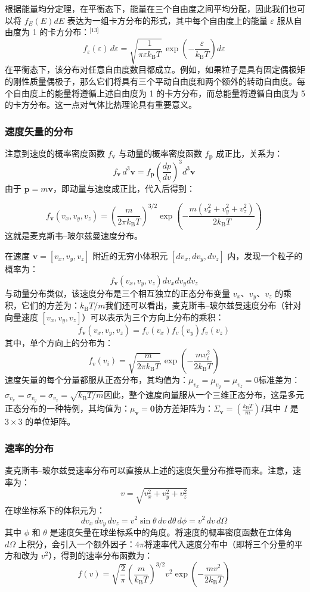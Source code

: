 根据能量均分定理，在平衡态下，能量在三个自由度之间平均分配，因此我们也可以将 $f_E(E) dE$ 表达为一组卡方分布的形式，其中每个自由度上的能量 $\varepsilon$ 服从自由度为 1 的卡方分布：\(^\text{[13]}\)
$$
f_\varepsilon(\varepsilon)\, d\varepsilon = \sqrt{ \frac{1}{\pi \varepsilon k_{\text{B}} T} }\, \exp\left( -\frac{\varepsilon}{k_{\text{B}} T} \right) d\varepsilon~
$$
在平衡态下，该分布对任意自由度数目都成立。例如，如果粒子是具有固定偶极矩的刚性质量偶极子，那么它们将具有三个平动自由度和两个额外的转动自由度。每个自由度上的能量将遵循上述自由度为 1 的卡方分布，而总能量将遵循自由度为 5 的卡方分布。这一点对气体比热理论具有重要意义。
\subsubsection{速度矢量的分布}
注意到速度的概率密度函数 $f_{\mathbf{v}}$ 与动量的概率密度函数 $f_{\mathbf{p}}$ 成正比，关系为：
$$
f_{\mathbf{v}}\, d^3\mathbf{v} = f_{\mathbf{p}} \left( \frac{dp}{dv} \right)^3 d^3\mathbf{v}~
$$
由于 $\mathbf{p} = m \mathbf{v}$，即动量与速度成正比，代入后得到：

$$
f_{\mathbf{v}}(v_x, v_y, v_z) = \left( \frac{m}{2\pi k_{\text{B}} T} \right)^{3/2} \exp\left( -\frac{m (v_x^2 + v_y^2 + v_z^2)}{2 k_{\text{B}} T} \right)~
$$
这就是麦克斯韦–玻尔兹曼速度分布。

在速度 $\mathbf{v} = [v_x, v_y, v_z]$ 附近的无穷小体积元 $[dv_x, dv_y, dv_z]$ 内，发现一个粒子的概率为：
$$
f_{\mathbf{v}}(v_x, v_y, v_z) dv_x dv_y dv_z~
$$
与动量分布类似，该速度分布是三个相互独立的正态分布变量 $v_x$、$v_y$、$v_z$ 的乘积，它们的方差为：$k_{\text{B}} T/m$我们还可以看出，麦克斯韦–玻尔兹曼速度分布（针对向量速度 $[v_x, v_y, v_z]$）可以表示为三个方向上分布的乘积：
$$
f_{\mathbf{v}}(v_x, v_y, v_z) = f_v(v_x) f_v(v_y) f_v(v_z)~
$$
其中，单个方向上的分布为：
$$
f_v(v_i) = \sqrt{ \frac{m}{2\pi k_{\text{B}} T} }\, \exp\left( -\frac{m v_i^2}{2 k_{\text{B}} T} \right)~
$$
速度矢量的每个分量都服从正态分布，其均值为：$\mu_{v_x} = \mu_{v_y} = \mu_{v_z} = 0$标准差为：$\sigma_{v_x} = \sigma_{v_y} = \sigma_{v_z} = \sqrt{ k_{\text{B}} T/m }$因此，整个速度向量服从一个三维正态分布，这是多元正态分布的一种特例，其均值为：$\mu_{\mathbf{v}} = \mathbf{0}$协方差矩阵为：$\Sigma_{\mathbf{v}} = \left( \frac{k_{\text{B}} T}{m} \right) I$其中 $I$ 是 $3 \times 3$ 的单位矩阵。
\subsubsection{速率的分布}
麦克斯韦–玻尔兹曼速率分布可以直接从上述的速度矢量分布推导而来。注意，速率为：
$$
v = \sqrt{v_x^2 + v_y^2 + v_z^2}~
$$
在球坐标系下的体积元为：
$$
dv_x\, dv_y\, dv_z = v^2 \sin\theta\, dv\, d\theta\, d\phi = v^2\, dv\, d\Omega~
$$
其中 $\phi$ 和 $\theta$ 是速度矢量在球坐标系中的角度。将速度的概率密度函数在立体角 $d\Omega$ 上积分，会引入一个额外因子：$4\pi$将速率代入速度分布中（即将三个分量的平方和改为 $v^2$），得到的速率分布函数为：
$$
f(v) = \sqrt{\frac{2}{\pi}} \left( \frac{m}{k_{\text{B}} T} \right)^{3/2} v^2 \exp\left( -\frac{m v^2}{2 k_{\text{B}} T} \right)~
$$
